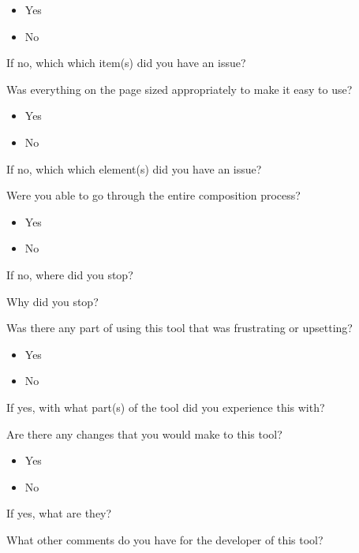 \begin{itemize}
	\item Yes
	\item No
\end{itemize}

\noindent If no, which which item(s) did you have an issue?

\vspace{\baselineskip}

\noindent Was everything on the page sized appropriately to make it easy to use?

\begin{itemize}
	\item Yes
	\item No
\end{itemize}

\noindent If no, which which element(s) did you have an issue?

\vspace{\baselineskip}

\noindent Were you able to go through the entire composition process?

\begin{itemize}
	\item Yes
	\item No
\end{itemize}

\noindent If no, where did you stop?

\vspace{\baselineskip}

\noindent Why did you stop?

\vspace{\baselineskip}

\noindent Was there any part of using this tool that was frustrating or upsetting?

\begin{itemize}
	\item Yes
	\item No
\end{itemize}

\noindent If yes, with what part(s) of the tool did you experience this with?

\vspace{\baselineskip}

\noindent Are there any changes that you would make to this tool?

\begin{itemize}
	\item Yes
	\item No
\end{itemize}

\noindent If yes, what are they?

\vspace{\baselineskip}

\noindent What other comments do you have for the developer of this tool?